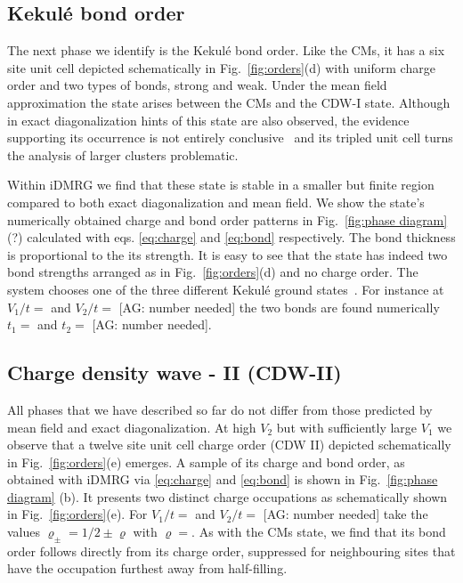 \documentclass[aps,prx,10pt,twocolumn,floatfix,superscriptaddress,showpacs,numerical,footinbib]{revtex4-1}
\newcommand{\noteAG}[1]{{\color{blue} [AG: #1]}}
\begin{document}
\subsection{Kekul\'{e} bond order}
%
The next phase we identify is the Kekul\'{e}
bond order.
%
Like the CMs, it has a six site unit cell depicted schematically in Fig.~\ref{fig:orders}(d)
with uniform charge order and two types of bonds, strong and weak.
%
Under the mean field approximation the state arises between the CMs and the CDW-I state.
%
Although in exact diagonalization hints of this state are also observed,
the evidence supporting its occurrence is not entirely conclusive~\cite{GGNVC13} and
its tripled unit cell turns the analysis of larger clusters problematic.
%

Within iDMRG we find that these state is stable in a smaller but finite region compared to both 
exact diagonalization and mean field.
%
We show the state's numerically obtained charge and bond order patterns in Fig.~\ref{fig:phase diagram} (?) 
calculated with eqs. \eqref{eq:charge} and \eqref{eq:bond} respectively.
%
The bond thickness is proportional to the its strength.
%
It is easy to see that the state has indeed two bond strengths arranged as in Fig.~\ref{fig:orders}(d) 
and no charge order.
%
The system chooses one of the three different Kekul\'{e} ground states~\cite{WF10}.
%
For instance at $V_{1}/t=$ and $V_{2}/t=$\noteAG{number needed} the two bonds are found numerically $t_{1}=$ and $t_{2}=$\noteAG{number needed}.



\subsection{Charge density wave - II (CDW-II)}
%
All phases that we have described so far do not differ
from those predicted by mean field and exact diagonalization.
%
At high $V_{2}$ but with sufficiently large $V_{1}$ we observe that
a twelve site unit cell charge order (CDW II) depicted schematically in 
Fig.~\ref{fig:orders}(e) emerges.
%
A sample of its charge and bond order, as obtained with iDMRG via \eqref{eq:charge} and \eqref{eq:bond} is
shown in Fig.~\ref{fig:phase diagram} (b).
%
It presents two distinct charge occupations as schematically shown in Fig.~\ref{fig:orders}(e).
%
For $V_{1}/t=$ and $V_{2}/t=$\noteAG{number needed} 
take the values $\varrho_{\pm}=1/2\pm\varrho$ with $\varrho=$.
%
As with the CMs state, we find that its bond order follows directly from its charge order, suppressed for neighbouring sites that have
the occupation furthest away from half-filling.\\
%
\end{document}
